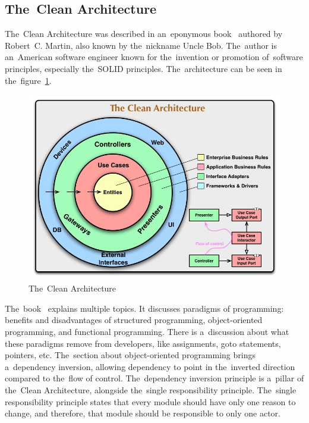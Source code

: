 \subsection{The~Clean Architecture}
\label{design:architecture:clean-archiecture}

The~Clean Architecture was described in an~eponymous book~\cite{martin_2018_clean_architecture} authored by Robert~C. Martin, also known by the~nickname Uncle Bob.
The~author is an~American software engineer known for the~invention or promotion of~software principles, especially the~SOLID principles.
The~architecture can be seen in the~figure~\ref{fig:thecleanarchitecture}. 

\begin{figure}
    \centering
    \includegraphics[width=1\linewidth]{assets/design/cleanarchitecture.jpg}
    \caption{The~Clean Architecture~\cite{a2021_clean_architecture_blog}}
    \label{fig:thecleanarchitecture}
\end{figure}

The~book~\cite{martin_2018_clean_architecture} explains multiple topics.
It discusses paradigms of programming: benefits and disadvantages of structured programming, object-oriented programming, and functional programming.
There is a~discussion about what these paradigms remove from developers, like assignments, goto statements, pointers, etc.
The~section about object-oriented programming brings a~dependency inversion, allowing dependency to point in the~inverted direction compared to the~flow of control.
The~dependency inversion principle is a~pillar of the~Clean Architecture, alongside the~single responsibility principle.
The~single responsibility principle states that every module should have only one reason to change, and therefore, that module should be responsible to only one actor.

